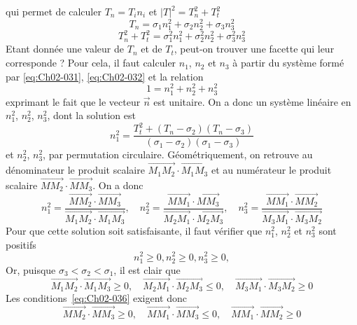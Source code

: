 qui permet de calculer $T_n = T_i n_i$ et $|T|^2 = T_n^2 + T_t^2$
\begin{equation}
    T_n = \sigma_1 n_1^2 + \sigma_2 n_2^2 + \sigma_3 n_3^2
    \label{eq:Ch02-031}
\end{equation}
\begin{equation}
    T_n^2 + T_t^2 = \sigma_1^2 n_1^2 + \sigma_2^2 n_2^2 + \sigma_3^2 n_3^2
    \label{eq:Ch02-032}
\end{equation}
Etant donnée une valeur de $T_n$ et de $T_t$, peut-on trouver une facette qui leur corresponde ?
Pour cela, il faut calculer $n_1$, $n_2$ et $n_3$ à partir du système formé par \eqref{eq:Ch02-031}, \eqref{eq:Ch02-032} et la relation 
\begin{equation}
    1 = n_1^2 + n_2^2 + n_3^2
    \label{eq:Ch02-033}
\end{equation}
exprimant le fait que le vecteur $\vec{n}$ est unitaire.
On a donc un système linéaire en $n_1^2$, $n_2^2$, $n_3^2$, dont la solution est 
\begin{equation}
    n_1^2 = \frac{T_t^2 + \left( T_n - \sigma_2 \right)\left( T_n - \sigma_3 \right)}{\left( \sigma_1 - \sigma_2 \right)\left( \sigma_1 - \sigma_3 \right)}
    \label{eq:Ch02-034}
\end{equation}
et $n_2^2$, $n_3^2$, par permutation circulaire.
Géométriquement, on retrouve au dénominateur le produit scalaire $\vec{M_1M_2}\cdot\vec{M_1M_3}$ et au numérateur le produit scalaire $\vec{MM_2}\cdot \vec{MM_3}$.
On a donc 
\begin{equation}
    n_1^2 = \frac{\vec{MM_2} \cdot \vec{MM_3}}{\vec{M_1M_2} \cdot \vec{M_1M_3}},\quad n_2^2 = \frac{\vec{MM_1} \cdot \vec{MM_3}}{\vec{M_2M_1} \cdot \vec{M_2M_3}},\quad n_3^2 = \frac{\vec{MM_1} \cdot \vec{MM_2}}{\vec{M_3M_1} \cdot \vec{M_3M_2}}
    \label{eq:Ch02-035}
\end{equation}
Pour que cette solution soit satisfaisante, il faut vérifier que $n_1^2$, $n_2^2$ et $n_3^2$ sont positifs 
\begin{equation}
    n_1^2 \geq 0, n_2^2 \geq 0, n_3^2 \geq 0, 
    \label{eq:Ch02-036}
\end{equation}
Or, puisque $\sigma_3 < \sigma_2 < \sigma_1$, il est clair que
\begin{equation}
    \vec{M_1M_2} \cdot \vec{M_1M_3} \geq 0, \quad \vec{M_2M_1} \cdot \vec{M_2M_3} \leq 0, \quad \vec{M_3M_1} \cdot \vec{M_3M_2} \geq 0
    \label{eq:Ch02-037}
\end{equation}
Les conditions~\eqref{eq:Ch02-036} exigent donc 
\begin{equation}
    \vec{MM_2} \cdot \vec{MM_3} \geq 0, \quad \vec{MM_1} \cdot \vec{MM_3} \leq 0, \quad \vec{MM_1} \cdot \vec{MM_2} \geq 0
    \label{eq:Ch02-038}
\end{equation}
